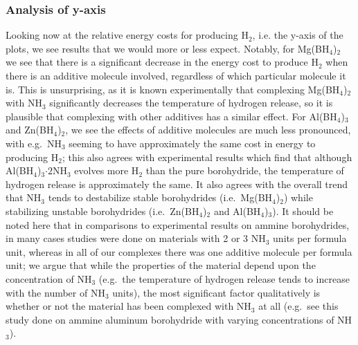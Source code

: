 \documentclass[twocolumn, prb, showpacs]{revtex4-1}
\begin{document}
\subsubsection{Analysis of y-axis}

Looking now at the relative energy costs for producing H$_2$, i.e. the y-axis
of the plots, we see results that we would more or less expect. Notably, for
Mg(BH$_4$)$_2$ we see that there is a significant decrease in the energy cost
to produce H$_2$ when there is an additive molecule involved, regardless of
which particular molecule it is. This is unsurprising, as it is known
experimentally that complexing
Mg(BH$_4$)$_2$ with NH$_3$ significantly decreases
the temperature of hydrogen release\cite{Soloveichik_2008:ammine_magnesium}, so it is
plausible that complexing with other additives has a similar effect.  For
Al(BH$_4$)$_3$ and Zn(BH$_4$)$_2$, we see the effects of additive molecules are
much less pronounced, with e.g.\ NH$_3$ seeming to have approximately the same cost in energy to
producing H$_2$; this also agrees with experimental results which find that
although Al(BH$_4$)$_3$$\cdot2$NH$_3$ evolves more H$_2$ than the pure borohydride,
the temperature of hydrogen release is approximately the
same\cite{Guo_2012:ammine_aluminium}.  It also agrees with the
overall trend that NH$_3$ tends to destabilize stable borohydrides (i.e.\
Mg(BH$_4$)$_2$) while stabilizing unstable borohydrides (i.e.\ Zn(BH$_4$)$_2$
and Al(BH$_4$)$_3$)\cite{Soloveichik_2008:ammine_magnesium}.  It should be noted here that
in comparisons to experimental results on ammine borohydrides, in many cases
studies were done on materials with 2 or 3 NH$_3$ units per formula unit, whereas in all of our
complexes there was one additive molecule per formula unit; we argue that while
the properties of the material depend upon the concentration of NH$_3$ (e.g.\ the temperature
of hydrogen release tends to increase with the number of NH$_3$ units), the
most significant factor qualitatively is whether or not the material has been
complexed with NH$_3$ at all (e.g.\ see this study done on ammine
aluminum borohydride with varying concentrations of NH$_3$)\cite{Guo_2012:ammine_aluminium}.
\end{document}
